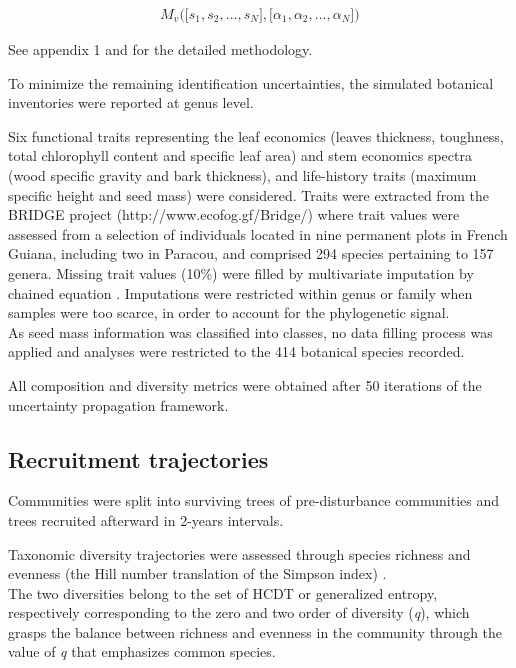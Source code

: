 \documentclass[fleqn,10pt]{ArtEcoFoG} %
\begin{document}
\begin{align}
M_v\Big(\big[s_1, s_2,..., s_N\big],\big[\alpha_1, \alpha_2,..., \alpha_N\big]\Big) \nonumber
\end{align}

See appendix 1 and \citet{Aubry-Kientz2013} for the detailed
methodology.

To minimize the remaining identification uncertainties, the simulated
botanical inventories were reported at genus level.

Six functional traits representing the leaf economics (leaves thickness,
toughness, total chlorophyll content and specific leaf area) and stem
economics spectra (wood specific gravity and bark thickness), and
life-history traits (maximum specific height and seed mass) were
considered. Traits were extracted from the BRIDGE project
(http://www.ecofog.gf/Bridge/) where trait values were assessed from a
selection of individuals located in nine permanent plots in French
Guiana, including two in Paracou, and comprised 294 species pertaining
to 157 genera. Missing trait values (10\%) were filled by multivariate
imputation by chained equation \citep{Mice2011}. Imputations were
restricted within genus or family when samples were too scarce, in order
to account for the phylogenetic signal.\\
As seed mass information was classified into classes, no data filling
process was applied and analyses were restricted to the 414 botanical
species recorded.

All composition and diversity metrics were obtained after 50 iterations
of the uncertainty propagation framework.

\subsection{Recruitment trajectories}\label{recruitment-trajectories}

Communities were split into surviving trees of pre-disturbance
communities and trees recruited afterward in 2-years intervals.

Taxonomic diversity trajectories were assessed through species richness
and evenness (the Hill number translation of the Simpson index)
\citep{chao2015, Marcon2015b}.\\
The two diversities belong to the set of HCDT or generalized entropy,
respectively corresponding to the zero and two order of diversity
(\emph{q}), which grasps the balance between richness and evenness in
the community through the value of \emph{q} that emphasizes common
species.
\end{document}
